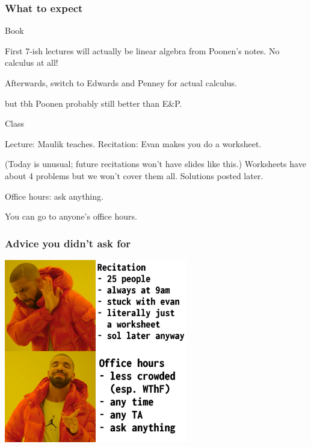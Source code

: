\documentclass[11pt]{beamer}
\begin{document}
\begin{frame}
  \frametitle{What to expect}
  \begin{block}{Book}
    \begin{itemize}
      \ii First 7-ish lectures will actually be \alert{linear algebra} from Poonen's notes.
      No calculus at all!

      \ii Afterwards, switch to Edwards and Penney for actual calculus.
      \begin{itemize}
        \ii but tbh Poonen probably still better than E\&P.
      \end{itemize}
    \end{itemize}
  \end{block}
  \begin{block}{Class}
    \begin{itemize}
      \ii Lecture: Maulik teaches.
      \ii Recitation: Evan makes you do a worksheet.
      \begin{itemize}
        \ii (Today is unusual; future recitations won't have slides like this.)
        \ii Worksheets have about 4 problems but we won't cover them all.
        \ii Solutions posted later.
      \end{itemize}
      \ii Office hours: ask anything.
      \begin{itemize}
        \ii You can go to anyone's office hours.
      \end{itemize}
    \end{itemize}
  \end{block}
\end{frame}

\begin{frame}
  \frametitle{Advice you didn't ask for}
  \begin{center}
    \includegraphics[width=0.6\textwidth]{hotline.jpg}
  \end{center}
\end{frame}
\end{document}
